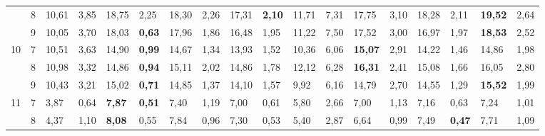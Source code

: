 \documentclass[conference]{IEEEtran}
\begin{document}
\begin{table*}[]
\begin{tabular}{|cl|ll|ll|ll|ll|ll|ll|ll|ll|}
		\multicolumn{1}{|c|}{} & 8 & \multicolumn{1}{l|}{10,61} & 3,85 & \multicolumn{1}{l|}{18,75} & 2,25 & \multicolumn{1}{l|}{18,30} & 2,26 & \multicolumn{1}{l|}{17,31} & \textbf{2,10} & \multicolumn{1}{l|}{11,71} & 7,31 & \multicolumn{1}{l|}{17,75} & 3,10 & \multicolumn{1}{l|}{18,28} & 2,11 & \multicolumn{1}{l|}{\textbf{19,52}} & 2,64 \\ \cline{2-18} 
		\multicolumn{1}{|c|}{} & 9 & \multicolumn{1}{l|}{10,05} & 3,70 & \multicolumn{1}{l|}{18,03} & \textbf{0,63} & \multicolumn{1}{l|}{17,96} & 1,86 & \multicolumn{1}{l|}{16,48} & 1,95 & \multicolumn{1}{l|}{11,22} & 7,50 & \multicolumn{1}{l|}{17,52} & 3,00 & \multicolumn{1}{l|}{16,97} & 1,97 & \multicolumn{1}{l|}{\textbf{18,53}} & 2,52 \\ \hline
		\multicolumn{1}{|c|}{\multirow{3}{*}{10}} & 7 & \multicolumn{1}{l|}{10,51} & 3,63 & \multicolumn{1}{l|}{14,90} & \textbf{0,99} & \multicolumn{1}{l|}{14,67} & 1,34 & \multicolumn{1}{l|}{13,93} & 1,52 & \multicolumn{1}{l|}{10,36} & 6,06 & \multicolumn{1}{l|}{\textbf{15,07}} & 2,91 & \multicolumn{1}{l|}{14,22} & 1,46 & \multicolumn{1}{l|}{14,86} & 1,98 \\ \cline{2-18} 
		\multicolumn{1}{|c|}{} & 8 & \multicolumn{1}{l|}{10,98} & 3,32 & \multicolumn{1}{l|}{14,86} & \textbf{0,94} & \multicolumn{1}{l|}{15,11} & 2,02 & \multicolumn{1}{l|}{14,86} & 1,78 & \multicolumn{1}{l|}{12,12} & 6,28 & \multicolumn{1}{l|}{\textbf{16,31}} & 2,41 & \multicolumn{1}{l|}{15,08} & 1,66 & \multicolumn{1}{l|}{16,05} & 2,80 \\ \cline{2-18} 
		\multicolumn{1}{|c|}{} & 9 & \multicolumn{1}{l|}{10,43} & 3,21 & \multicolumn{1}{l|}{15,02} & \textbf{0,71} & \multicolumn{1}{l|}{14,85} & 1,37 & \multicolumn{1}{l|}{14,10} & 1,57 & \multicolumn{1}{l|}{9,92} & 6,16 & \multicolumn{1}{l|}{14,79} & 2,70 & \multicolumn{1}{l|}{14,55} & 1,29 & \multicolumn{1}{l|}{\textbf{15,52}} & 1,99 \\ \hline
		\multicolumn{1}{|c|}{\multirow{3}{*}{11}} & 7 & \multicolumn{1}{l|}{3,87} & 0,64 & \multicolumn{1}{l|}{\textbf{7,87}} & \textbf{0,51} & \multicolumn{1}{l|}{7,40} & 1,19 & \multicolumn{1}{l|}{7,00} & 0,61 & \multicolumn{1}{l|}{5,80} & 2,66 & \multicolumn{1}{l|}{7,00} & 1,13 & \multicolumn{1}{l|}{7,16} & 0,63 & \multicolumn{1}{l|}{7,24} & 1,01 \\ \cline{2-18} 
		\multicolumn{1}{|c|}{} & 8 & \multicolumn{1}{l|}{4,37} & 1,10 & \multicolumn{1}{l|}{\textbf{8,08}} & 0,55 & \multicolumn{1}{l|}{7,84} & 0,96 & \multicolumn{1}{l|}{7,30} & 0,53 & \multicolumn{1}{l|}{5,40} & 2,87 & \multicolumn{1}{l|}{6,64} & 0,99 & \multicolumn{1}{l|}{7,49} & \textbf{0,47} & \multicolumn{1}{l|}{7,71} & 1,09 \\ \cline{2-18} 

\end{tabular}
\end{table*}
\end{document}

